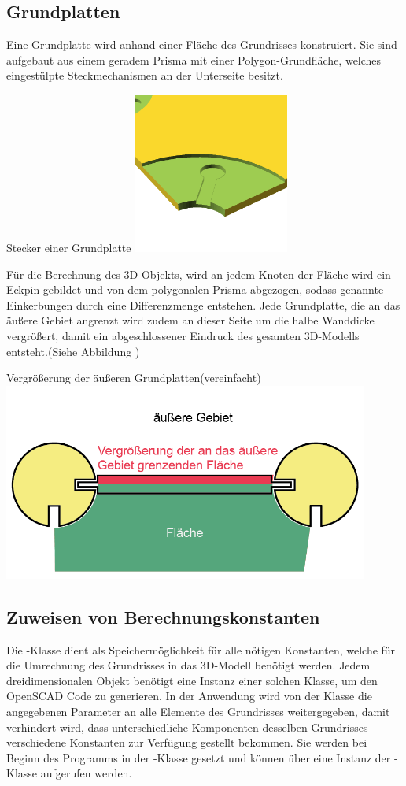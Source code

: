 \subsection{Grundplatten}
Eine Grundplatte wird anhand einer Fläche des Grundrisses konstruiert.
Sie sind aufgebaut aus einem geradem Prisma mit einer Polygon-Grundfläche, welches eingestülpte Steckmechanismen an der Unterseite besitzt.
\begin{Bild}{Stecker einer Grundplatte}
	\includegraphics[height=200px]{Bilder/Untereinheit_GP}
\end{Bild}
Für die Berechnung des 3D-Objekts, wird an jedem Knoten der Fläche wird ein Eckpin gebildet und von dem polygonalen Prisma abgezogen, sodass genannte Einkerbungen durch eine Differenzmenge entstehen. 
Jede Grundplatte, die an das äußere Gebiet angrenzt wird zudem an dieser Seite um die halbe Wanddicke vergrößert, damit ein abgeschlossener Eindruck des gesamten 3D-Modells entsteht.(Siehe Abbildung \thebildnr)
\begin{Bild}{Vergrößerung der äußeren Grundplatten(vereinfacht)}
	\includegraphics[width=120mm]{Bilder/GrundplatteVergroesserung-08}
\end{Bild}

\subsection{Zuweisen von Berechnungskonstanten}
\label{params}
Die -Klasse dient als Speichermöglichkeit für alle nötigen Konstanten, welche für die Umrechnung des Grundrisses in das 3D-Modell benötigt werden.
Jedem dreidimensionalen Objekt benötigt eine Instanz einer solchen Klasse, um den OpenSCAD Code zu generieren.
In der Anwendung wird von der Klasse  die angegebenen Parameter an alle Elemente des Grundrisses weitergegeben, damit verhindert wird, dass unterschiedliche Komponenten desselben Grundrisses verschiedene Konstanten zur Verfügung gestellt bekommen.
Sie werden bei Beginn des Programms in der -Klasse gesetzt und können über eine Instanz der -Klasse aufgerufen werden.

